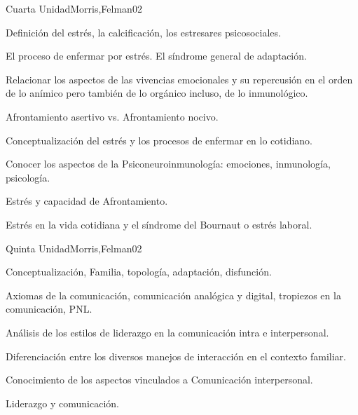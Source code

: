 \begin{syllabus}
\begin{unit}{Cuarta Unidad}{Morris,Felman}{0}{2}
\begin{topics}
	\item Definición del estrés, la calcificación, los estresares psicosociales.
	\item El proceso de enfermar por estrés. El síndrome general de adaptación.
	\item Relacionar los aspectos de las vivencias emocionales y su repercusión en el orden de lo anímico pero también de lo orgánico incluso, de lo inmunológico.
	\item Afrontamiento asertivo vs. Afrontamiento nocivo.
\end{topics}
\begin{unitgoals}
	\item Conceptualización del estrés y los procesos de enfermar en lo cotidiano.
	\item Conocer los aspectos de la Psiconeuroinmunología: emociones, inmunología, psicología.
	\item Estrés y capacidad de Afrontamiento.
	\item Estrés en la vida cotidiana y el síndrome del Bournaut o estrés laboral.
\end{unitgoals}
\end{unit}

\begin{unit}{Quinta Unidad}{Morris,Felman}{0}{2}
\begin{topics}
	\item Conceptualización, Familia, topología, adaptación, disfunción.
	\item Axiomas de la comunicación, comunicación analógica y digital, tropiezos en la comunicación, PNL.
	\item Análisis de los estilos de liderazgo en la comunicación intra e interpersonal.
\end{topics}
\begin{unitgoals}
	\item Diferenciación entre los diversos manejos de interacción en el contexto familiar.
	\item Conocimiento de los aspectos vinculados a Comunicación interpersonal.
	\item Liderazgo y comunicación.
\end{unitgoals}
\end{unit}


\end{syllabus}
